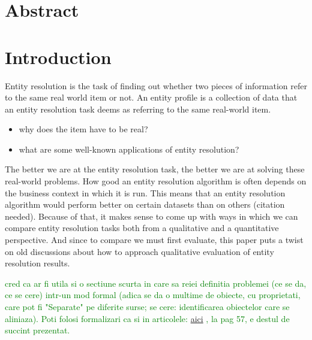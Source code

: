 \documentclass[11pt]{article}
\begin{document}
    \section{Abstract}\label{section:abstract}


    \section{Introduction}\label{section:introduction}

    Entity resolution is the task of finding out whether two pieces of information refer to the same real world item or not. An entity profile is a collection of data that an entity resolution task deems as referring to the same real-world item.
    \begin{itemize}
        \item why does the item have to be real?
        \item what are some well-known applications of entity resolution?
    \end{itemize}
    The better we are at the entity resolution task, the better we are at solving these real-world problems. How good an entity resolution algorithm is often depends on the business context in which it is run. This means that an entity resolution algorithm would perform better on certain datasets than on others  (citation needed). Because of that, it makes sense to come up with ways in which we can compare entity resolution tasks both from a qualitative and a quantitative perspective. And since to compare we must first evaluate, this paper puts a twist on old discussions about how to approach qualitative evaluation of entity resolution results.

    \textcolor{green}{cred ca ar fi utila si o sectiune scurta in care sa reiei definitia problemei (ce se da, ce se cere) intr-un mod formal (adica se da o multime de obiecte, cu proprietati, care pot fi "Separate" pe diferite surse; se cere: identificarea obiectelor care se aliniaza). Poti folosi formalizari ca si in articolele:} \href{https://d1wqtxts1xzle7.cloudfront.net/30672623/A11SEP-CD-libre.pdf?1391815744=&response-content-disposition=inline%3B+filename%3DA_Uniform_Dependency_Language_for_Improv.pdf&Expires=1693931642&Signature=G-sCf5o-XZNgP~WX0yxCtzzbvCqj4~Tu4dka6QLKrOk6zPZ5XTrOZD5kqcQxJJa48w5-2Ya31rd4b~BV1bR5kJMwuFcsGzAPcQqDhpRhVxoki41kZUSYU73pVTcfyqeE3l7gTg6Qriuowj8xM3LgHfHUft80iguUhSMUDmC2FLg7WGjHWETeKquMv51t9sKpyIQHG11wggW2XMkcx1tygkd92b339bqEX-urQhQN9irKBou-dmrJvF2O7qb2LxZsb4fwYLvwi0vOZ6fzVguOdsRIcqm6uzdmQn3tPV1oMpcx4Qy6q-dUWNm4uzJZ9PbzW5Wo351FXZVogeepZGXFcw__&Key-Pair-Id=APKAJLOHF5GGSLRBV4ZA#page=53}{aici} 
    \textcolor{green}{, la pag 57, e destul de succint prezentat.}
    
\end{document}
